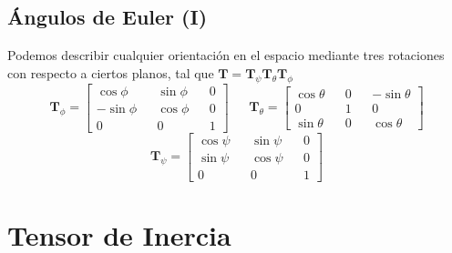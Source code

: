 \subsection{Ángulos de Euler (I)}
Podemos describir cualquier orientación en el espacio mediante tres rotaciones con respecto a ciertos planos, tal que $\mathbf{T} = \mathbf{T}_\psi \mathbf{T}_\theta \mathbf{T}_\phi$
\[\mathbf{T}_\phi = \left[\begin{matrix}
    \cos\phi && \sin\phi&& 0\\
    -\sin\phi && \cos\phi && 0\\
    0 && 0 && 1
\end{matrix}\right] \ \ \ \ \ \ \ 
\mathbf{T}_\theta = \left[\begin{matrix}
    \cos\theta && 0 && -\sin\theta \\
    0&& 1&& 0\\
    \sin\theta&& 0&& \cos\theta
\end{matrix}\right]\]
\[\mathbf{T}_\psi = \left[\begin{matrix}
    \cos\psi && \sin\psi&& 0\\
    \sin\psi && \cos\psi && 0\\
    0 && 0 && 1
\end{matrix}\right]\]
\vspace{-15pt}
\section{Tensor de Inercia}
\vspace{-15pt}
